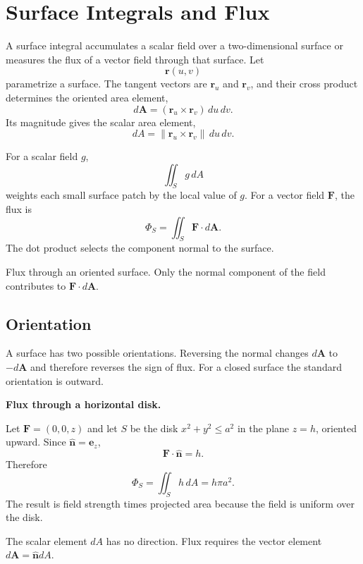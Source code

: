 \section{Surface Integrals and Flux}
\label{sec:surface-integrals}

A surface integral accumulates a scalar field over a two-dimensional surface or measures the flux of a vector field through that surface. Let
\[
\mathbf r(u,v)
\]
parametrize a surface. The tangent vectors are $\mathbf r_u$ and $\mathbf r_v$, and their cross product determines the oriented area element,
\[
\boxed{d\mathbf A=(\mathbf r_u\times\mathbf r_v)\,du\,dv.}
\]
Its magnitude gives the scalar area element,
\[
dA=\lVert\mathbf r_u\times\mathbf r_v\rVert\,du\,dv.
\]

For a scalar field $g$,
\[
\iint_S g\,dA
\]
weights each small surface patch by the local value of $g$. For a vector field $\mathbf F$, the flux is
\[
\boxed{\Phi_S=\iint_S\mathbf F\cdot d\mathbf A.}
\]
The dot product selects the component normal to the surface.

\begin{bookfigure}{Flux through an oriented surface. Only the normal component of the field contributes to $\mathbf F\cdot d\mathbf A$.}

\label{fig:surface-flux}
\end{bookfigure}

\subsection{Orientation}
A surface has two possible orientations. Reversing the normal changes $d\mathbf A$ to $-d\mathbf A$ and therefore reverses the sign of flux. For a closed surface the standard orientation is outward.

\begin{workedexample}
\textbf{Flux through a horizontal disk.}\par
Let $\mathbf F=(0,0,z)$ and let $S$ be the disk $x^2+y^2\leq a^2$ in the plane $z=h$, oriented upward. Since $\hat{\mathbf n}=\mathbf e_z$,
\[
\mathbf F\cdot\hat{\mathbf n}=h.
\]
Therefore
\[
\Phi_S=\iint_S h\,dA=h\pi a^2.
\]
The result is field strength times projected area because the field is uniform over the disk.
\end{workedexample}

\begin{mistakebox}
The scalar element $dA$ has no direction. Flux requires the vector element $d\mathbf A=\hat{\mathbf n}dA$.
\end{mistakebox}
